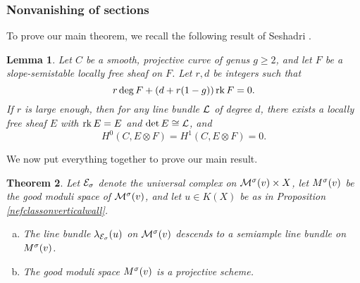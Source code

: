\documentclass[letterpaper,11pt]{amsart}%
\newtheorem{thm}{Theorem}[section]
\newtheorem{lem}[thm]{Lemma}
\theoremstyle{remark}
\begin{document}
\subsubsection{Nonvanishing of sections}
To prove our main theorem, we recall the following result of Seshadri \cite[Lemma 3.1, Remark 3.2]{seshadri}.
\begin{lem}\label{seshadrimainlemma}
    Let $C$ be a smooth, projective curve of genus $g \ge 2$, and let $F$ be a slope-semistable locally free sheaf on $F$. Let $r, d$ be integers such that
    \[ r \deg F + (d + r(1-g)) \operatorname{\mathrm{rk}} F = 0. \]
    If $r$ is large enough, then for any line bundle $\mathcal{L}$ of degree $d$, there exists a locally free sheaf $E$ with $\operatorname{\mathrm{rk}} E = E$ and $\det E \cong \mathcal{L}$, and
    \[ H^0(C, E \otimes F) = H^1(C, E \otimes F) = 0. \]
\end{lem}
We now put everything together to prove our main result.
\begin{thm}\label{projectivity}
    Let $\mathcal{E}_\sigma$ denote the universal complex on $\mathcal{M}^\sigma(v) \times X$, let $M^\sigma(v)$ be the good moduli space of $\mathcal{M}^\sigma(v)$, and let $u \in K(X)$ be as in Proposition \ref{nefclassonverticalwall}.
    \begin{enumerate}[(a)]
        \item The line bundle $\lambda_{\mathcal{E}_\sigma}(u)$ on $\mathcal{M}^\sigma(v)$ descends to a semiample line bundle on $M^\sigma(v)$.
        \item The good moduli space $M^\sigma(v)$ is a projective scheme.
    \end{enumerate}
\end{thm}
\end{document}

